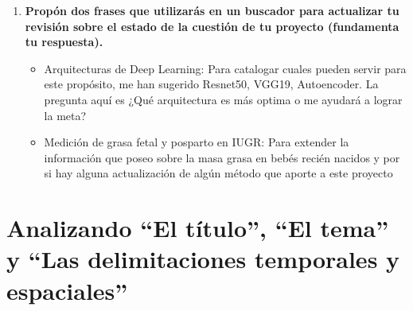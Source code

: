 \begin{enumerate}
	\item \textbf{Propón dos frases que utilizarás en un buscador para actualizar tu revisión sobre el estado de la cuestión
de tu proyecto (fundamenta tu respuesta).}
	\begin{itemize}
		\item Arquitecturas de Deep Learning: Para catalogar
		cuales pueden servir para este propósito, me han sugerido 
		Resnet50, VGG19, Autoencoder. La pregunta aquí es 
		¿Qué arquitectura es más optima o me ayudará a lograr la
		meta?
		
		\item Medición de grasa fetal y posparto en IUGR:
		Para extender la información que poseo sobre la masa
		grasa en bebés recién nacidos y por si hay alguna 
		actualización de algún método que aporte a este proyecto
	\end{itemize}
\end{enumerate}

\section{Analizando “El título”, “El tema” y “Las delimitaciones temporales y espaciales”}

